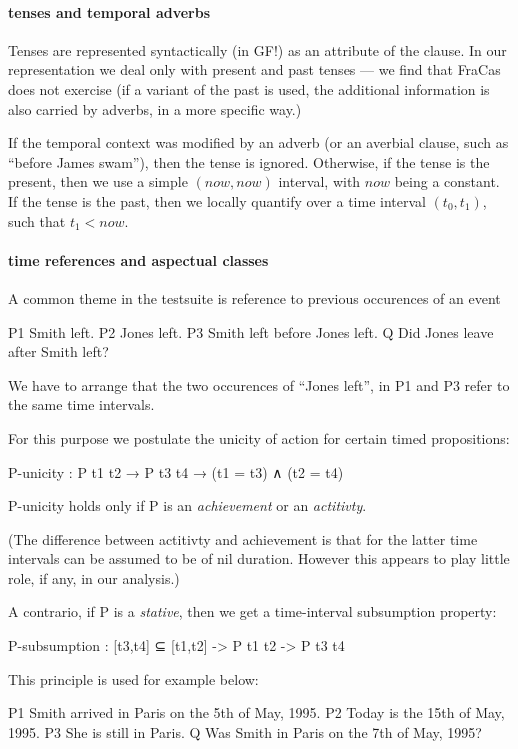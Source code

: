 \documentclass[a4paper,11pt]{article}
\begin{document}
\paragraph{tenses and temporal adverbs}

Tenses are represented syntactically (in GF!) as an attribute of the
clause. In our representation we deal only with present and past
tenses --- we find that FraCas does not exercise (if a variant of the
past is used, the additional information is also carried by adverbs,
in a more specific way.)

If the temporal context was modified by an adverb (or an averbial
clause, such as ``before James swam''), then the tense is ignored.
%
Otherwise, if the tense is the present, then we use a simple
$(now,now)$ interval, with $now$ being a constant.
%
If the tense is the past, then we locally quantify over a time
interval $(t_0,t_1)$, such that $t_1 < now$.

\paragraph{time references and aspectual classes}

A common theme in the testsuite is reference to previous occurences of an event

P1	Smith left.
P2	Jones left.
P3	Smith left before Jones left.
Q 	Did Jones leave after Smith left?

We have to arrange that the two occurences of ``Jones left'', in P1
and P3 refer to the same time intervals.

For this purpose we postulate the unicity of action for certain timed propositions:

P-unicity : P t1 t2 → P t3 t4 → (t1 = t3) ∧ (t2 = t4)

P-unicity holds only if P is an \emph{achievement} or an \emph{actitivty}.

(The difference between actitivty and achievement is that for the
latter time intervals can be assumed to be of nil duration. However
this appears to play little role, if any, in our analysis.)

A contrario, if P is a \emph{stative}, then we get a time-interval subsumption property:

P-subsumption : [t3,t4] ⊆ [t1,t2] -> P t1 t2 -> P t3 t4

This principle is used for example below:

P1	Smith arrived in Paris on the 5th of May, 1995.
P2	Today is the 15th of May, 1995.
P3	She is still in Paris.
Q 	Was Smith in Paris on the 7th of May, 1995? 
\end{document}
